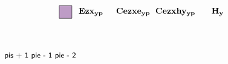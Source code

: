 \documentclass[10pt]{article}
\begin{document}
\[\begin{tikzpicture}
%
\node[draw=black,fill=moradoAmor!40,minimum width=1.5em,minimum height=1.5em,rectangle]  at (2em,0em) {}; %
%
\node[]  at (5em,0) {${\bf Ezx_{yp}}$};
\node[]  at (10em,0) {${\bf Cezxe_{yp}}$};
\node[]  at (15em,0) {${\bf Cezxhy_{yp}}$};
\node[]  at (20em,0) {${\bf H_{y}}$};
%
\node[]  at (-1em,-5.2em) {\small{\sf pis + 1 pie - 1 pie - 2}};
%
\end{tikzpicture}
\]
\end{document}

